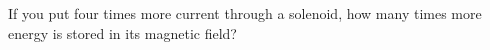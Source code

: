         If you put four times more current through a solenoid, how
        many times more energy is stored in its magnetic field?\answercheck
